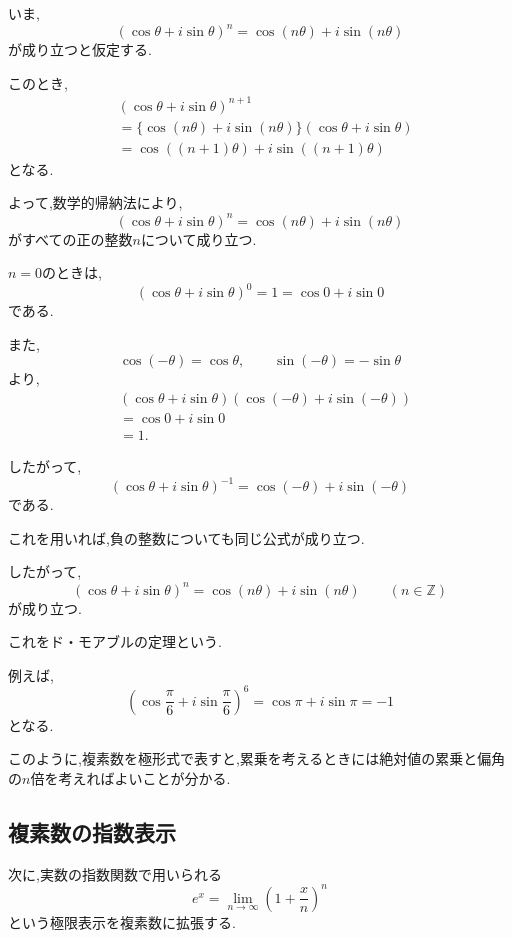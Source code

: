   いま,
  \[
    (\cos\theta+i\sin\theta)^n
    =
    \cos(n\theta)+i\sin(n\theta)
  \]
  が成り立つと仮定する.

  このとき,
  \begin{align*}
    &(\cos\theta+i\sin\theta)^{n+1}\\
    &=
    \{
      \cos(n\theta)+i\sin(n\theta)
    \}
    (\cos\theta+i\sin\theta)\\
    &=
    \cos((n+1)\theta)
    +i\sin((n+1)\theta)
  \end{align*}
  となる.

  よって,数学的帰納法により,
  \[
    (\cos\theta+i\sin\theta)^n
    =
    \cos(n\theta)+i\sin(n\theta)
  \]
  がすべての正の整数$n$について成り立つ.

  $n=0$のときは,
  \[
    (\cos\theta+i\sin\theta)^0
    =
    1
    =
    \cos0+i\sin0
  \]
  である.

  また,
  \[
    \cos(-\theta)=\cos\theta,
    \qquad
    \sin(-\theta)=-\sin\theta
  \]
  より,
  \begin{align*}
    &(\cos\theta+i\sin\theta)
    (\cos(-\theta)+i\sin(-\theta))\\
    &=
    \cos0+i\sin0\\
    &=
    1.
  \end{align*}

  したがって,
  \[
    (\cos\theta+i\sin\theta)^{-1}
    =
    \cos(-\theta)+i\sin(-\theta)
  \]
  である.

  これを用いれば,負の整数についても同じ公式が成り立つ.

  したがって,
  \[
    (\cos\theta+i\sin\theta)^n
    =
    \cos(n\theta)+i\sin(n\theta)
    \qquad(n\in\mathbb Z)
  \]
  が成り立つ.

  これをド・モアブルの定理という.

  例えば,
  \[
    \left(
      \cos\frac{\pi}{6}
      +i\sin\frac{\pi}{6}
    \right)^6
    =
    \cos\pi+i\sin\pi
    =
    -1
  \]
  となる.

  このように,複素数を極形式で表すと,累乗を考えるときには絶対値の累乗と偏角の$n$倍を考えればよいことが分かる.


\subsection{複素数の指数表示}

  次に,実数の指数関数で用いられる
  \[
    e^x
    =
    \lim_{n\to\infty}
    \left(
      1+\frac{x}{n}
    \right)^n
  \]
  という極限表示を複素数に拡張する.

